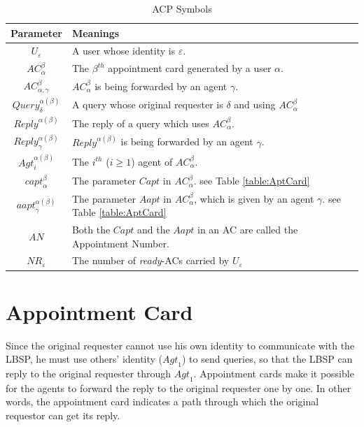\begin{table} [hbtp]
\caption{ACP Symbols}
\label{table:ACPSymbols}
\centering
\tabulinesep=2mm
\begin{tabu}{|c|l|} \hline 
Parameter & Meanings \\ \hline 
${U}_{\varepsilon}$ & A user whose identity is $\varepsilon$. \\ \hline 
${AC}_{\alpha}^{\beta}$ & The $\beta^{th}$ appointment card generated by a user $\alpha$. \\ \hline 
${AC}_{{\alpha},{\gamma}}^{\beta}$ & ${AC}_{\alpha}^{\beta}$ is being forwarded by an agent $\gamma$. \\ \hline 
${Query}_{\delta}^{{\alpha}\left({\beta}\right)}$ & A query whose original requester is $\delta$ and using ${AC}_{\alpha}^{\beta}$ \\ \hline 
${{Reply}}^{{\alpha}\left({\beta}\right)}$ & The reply of a query which uses ${AC}_{\alpha}^{\beta}$. \\ \hline 
${{Reply}}_{\gamma}^{{\alpha}\left({\beta}\right)}$ & ${Reply}^{\alpha\left(\beta\right)}$ is being forwarded by an agent $\gamma$. \\ \hline 
${{Agt}}_{i}^{{\alpha}\left({\beta}\right)}$ & The $i^{th}$ ($i\geq1$) agent of ${AC}_{\alpha}^{\beta}$. \\ \hline 
${{capt}}_{\alpha}^{\beta}$ & The parameter $Capt$ in ${AC}_\alpha^\beta$. see Table \ref{table:AptCard} \\ \hline 
${{aapt}}_{\gamma}^{{\alpha}\left({\beta}\right)}$ & The parameter $Aapt$ in ${AC}_{\alpha}^{\beta}$, which is given by an agent $\gamma$. see Table \ref{table:AptCard} \\ \hline 
$AN$ & Both the $Capt$ and the $Aapt$ in an AC are called the Appointment Number. \\ \hline 
${NR}_{\varepsilon}$ & The number of \textit{ready}-ACs carried by ${U}_{\varepsilon}$ \\ \hline 
\end{tabu}
\end{table}

\section{ Appointment Card}

\noindent Since the original requester cannot use his own identity to communicate with the LBSP, he must use others' identity (${Agt}_1$) to send queries, so that the LBSP can reply to the original requester through ${Agt}_1$. Appointment cards make it possible for the agents to forward the reply to the original requester one by one. In other words, the appointment card indicates a path through which the original requestor can get its reply. 

